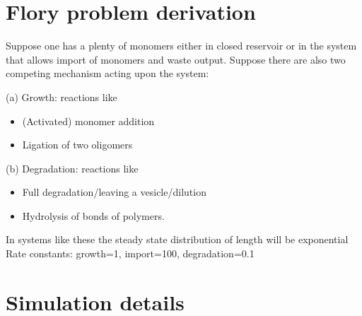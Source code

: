 \documentclass[12pt]{paper}
\begin{document}
 \newpage
\appendix
\section{Flory problem derivation}\label{sec:flory-derivation}
Suppose one has a plenty of monomers either in closed reservoir or in the system that allows 
import of monomers and waste output. Suppose there are also two competing mechanism acting upon 
the system: 
\par (a) Growth: reactions like
\begin{itemize}
  \item (Activated) monomer addition
  \item Ligation of two oligomers
\end{itemize}
\par (b) Degradation: reactions like
\begin{itemize}
  \item Full degradation/leaving a vesicle/dilution
  \item Hydrolysis of bonds of polymers.
\end{itemize}
In systems like these the steady state distribution of length will be exponential
Rate constants: growth=1, import=100, degradation=0.1

\section{Simulation details}



 
 
\end{document}
